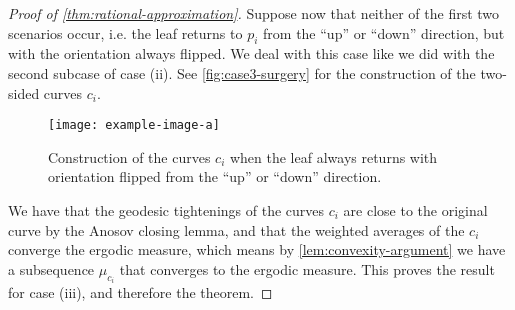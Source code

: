 \documentclass[12pt, reqno]{amsart}
\begin{document}
\begin{proof}[Proof of \autoref{thm:rational-approximation}]
  Suppose now that neither of the first two scenarios occur, i.e. the leaf returns to $p_i$ from the ``up'' or ``down'' direction, but with the orientation always flipped.
  We deal with this case like we did with the second subcase of case (ii).
  See \autoref{fig:case3-surgery} for the construction of the two-sided curves $c_i$.
  \begin{figure}[h]
    \centering
    \texttt{[image: example-image-a]}
    \caption{Construction of the curves $c_i$ when the leaf always returns with orientation flipped from the ``up'' or ``down'' direction.}
    \label{fig:case3-surgery}
  \end{figure}
  We have that the geodesic tightenings of the curves $c_i$ are close to the original curve by the Anosov closing lemma, and that the weighted averages of the $c_i$ converge the ergodic measure, which means by \autoref{lem:convexity-argument} we have a subsequence $\mu_{c_i}$ that converges to the ergodic measure.
  This proves the result for case (iii), and therefore the theorem.
\end{proof}

\end{document}
